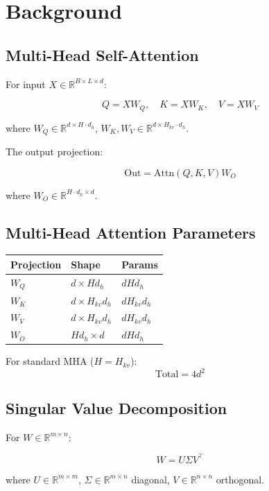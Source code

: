 \section{Background}

\subsection{Multi-Head Self-Attention}

For input $X \in \mathbb{R}^{B \times L \times d}$:

\[
Q = X W_Q, \quad K = X W_K, \quad V = X W_V
\]

where $W_Q \in \mathbb{R}^{d \times H \cdot d_h}$, $W_K, W_V \in \mathbb{R}^{d \times H_{kv} \cdot d_h}$.

The output projection:

\[
\text{Out} = \text{Attn}(Q, K, V) W_O
\]

where $W_O \in \mathbb{R}^{H \cdot d_h \times d}$.

\subsection{Multi-Head Attention Parameters}

\begin{table}[H]
\centering
\small
\begin{tabular}{lll}
\toprule
\textbf{Projection} & \textbf{Shape} & \textbf{Params} \\
\midrule
$W_Q$ & $d \times H d_h$ & $d H d_h$ \\
$W_K$ & $d \times H_{kv} d_h$ & $d H_{kv} d_h$ \\
$W_V$ & $d \times H_{kv} d_h$ & $d H_{kv} d_h$ \\
$W_O$ & $H d_h \times d$ & $d H d_h$ \\
\bottomrule
\end{tabular}
\end{table}

For standard MHA ($H = H_{kv}$):
\[
\text{Total} = 4 d^2
\]

\subsection{Singular Value Decomposition}

For $W \in \mathbb{R}^{m \times n}$:

\[
W = U \Sigma V^\top
\]

where $U \in \mathbb{R}^{m \times m}$, $\Sigma \in \mathbb{R}^{m \times n}$ diagonal, 
$V \in \mathbb{R}^{n \times n}$ orthogonal.

